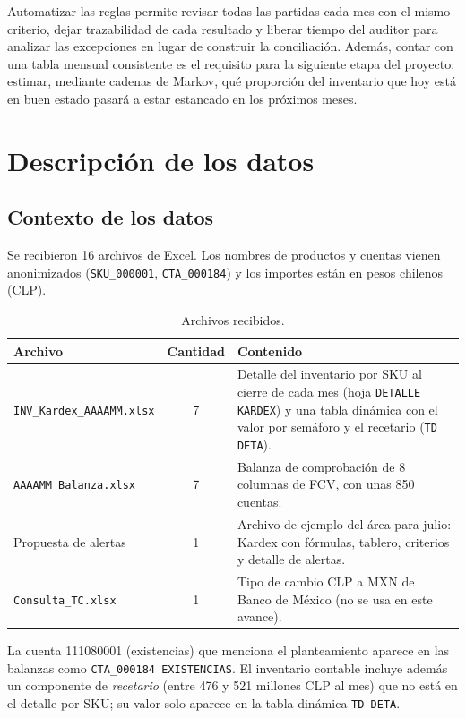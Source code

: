 \documentclass[11pt,letterpaper]{article}
\begin{document}
Automatizar las reglas permite revisar todas las partidas cada mes con el mismo criterio, dejar trazabilidad de cada resultado y liberar tiempo del auditor para analizar las excepciones en lugar de construir la conciliación. Además, contar con una tabla mensual consistente es el requisito para la siguiente etapa del proyecto: estimar, mediante cadenas de Markov, qué proporción del inventario que hoy está en buen estado pasará a estar estancado en los próximos meses.

\section{Descripción de los datos}

\subsection{Contexto de los datos}

Se recibieron 16 archivos de Excel. Los nombres de productos y cuentas vienen anonimizados (\texttt{SKU\_000001}, \texttt{CTA\_000184}) y los importes están en pesos chilenos (CLP).

\begin{table}[h]
\centering\small
\begin{tabularx}{\textwidth}{@{}l c L@{}}
\toprule
Archivo & Cantidad & Contenido \\
\midrule
\texttt{INV\_Kardex\_AAAAMM.xlsx} & 7 & Detalle del inventario por SKU al cierre de cada mes (hoja \texttt{DETALLE KARDEX}) y una tabla dinámica con el valor por semáforo y el recetario (\texttt{TD DETA}). \\
\texttt{AAAAMM\_Balanza.xlsx} & 7 & Balanza de comprobación de 8 columnas de FCV, con unas 850 cuentas. \\
Propuesta de alertas & 1 & Archivo de ejemplo del área para julio: Kardex con fórmulas, tablero, criterios y detalle de alertas. \\
\texttt{Consulta\_TC.xlsx} & 1 & Tipo de cambio CLP a MXN de Banco de México (no se usa en este avance). \\
\bottomrule
\end{tabularx}
\caption{Archivos recibidos.}
\end{table}

La cuenta 111080001 (existencias) que menciona el planteamiento aparece en las balanzas como \texttt{CTA\_000184 EXISTENCIAS}. El inventario contable incluye además un componente de \emph{recetario} (entre 476 y 521 millones CLP al mes) que no está en el detalle por SKU; su valor solo aparece en la tabla dinámica \texttt{TD DETA}.
\end{document}
